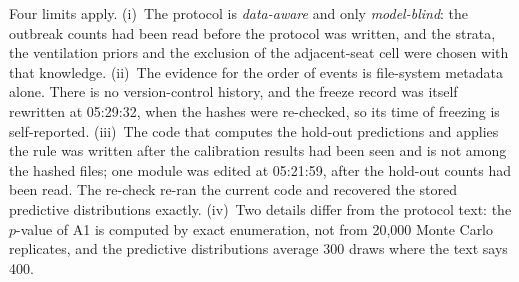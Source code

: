 Four limits apply. (i)~The protocol is \emph{data-aware} and only \emph{model-blind}: the outbreak
counts had been read before the protocol was written, and the strata, the ventilation priors and the exclusion
of the adjacent-seat cell were chosen with that knowledge. (ii)~The evidence for the order of events is
file-system metadata alone. There is no version-control history, and the freeze record was itself rewritten at
05:29:32, when the hashes were re-checked, so its time of freezing is self-reported. (iii)~The code that
computes the hold-out predictions and applies the rule was written after the calibration results had been seen
and is not among the hashed files; one module was edited at 05:21:59, after the hold-out counts had been read.
The re-check re-ran the current code and recovered the stored predictive distributions exactly.
(iv)~Two details differ from the protocol text: the $p$-value of A1 is computed by exact enumeration, not from
20{,}000 Monte Carlo replicates, and the predictive distributions average 300 draws where the text says 400.

